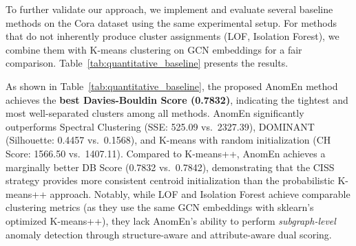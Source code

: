 To further validate our approach, we implement and evaluate several baseline methods on the Cora dataset using the same experimental setup. For methods that do not inherently produce cluster assignments (LOF, Isolation Forest), we combine them with K-means clustering on GCN embeddings for a fair comparison. Table~\ref{tab:quantitative_baseline} presents the results.

\begin{table}[ht]
\centering
\caption{Quantitative Comparison of AnomEn with Baseline Methods on the Cora Dataset}
\label{tab:quantitative_baseline}
\end{table}

As shown in Table~\ref{tab:quantitative_baseline}, the proposed AnomEn method achieves the \textbf{best Davies-Bouldin Score (0.7832)}, indicating the tightest and most well-separated clusters among all methods. AnomEn significantly outperforms Spectral Clustering (SSE: 525.09 vs.\ 2327.39), DOMINANT (Silhouette: 0.4457 vs.\ 0.1568), and K-means with random initialization (CH Score: 1566.50 vs.\ 1407.11). Compared to K-means++, AnomEn achieves a marginally better DB Score (0.7832 vs.\ 0.7842), demonstrating that the CISS strategy provides more consistent centroid initialization than the probabilistic K-means++ approach. Notably, while LOF and Isolation Forest achieve comparable clustering metrics (as they use the same GCN embeddings with sklearn's optimized K-means++), they lack AnomEn's ability to perform \textit{subgraph-level} anomaly detection through structure-aware and attribute-aware dual scoring.

